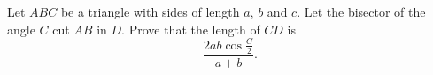 Let $ABC$ be a triangle with sides of length $a$,  $b$ and $c$. Let the bisector of the angle $C$ cut $AB$ in $D$. Prove that the length of $CD$ is \[ \frac{2ab\cos \frac{C}{2}}{a+b}. \]